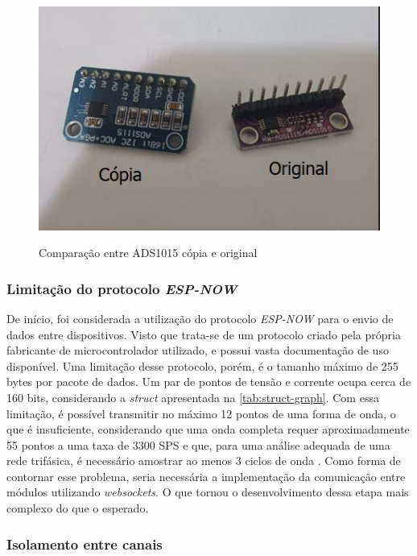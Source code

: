 \begin{figure}[h!]
    \centering
    \caption{Comparação entre ADS1015 cópia e original}
    \includegraphics[width=\textwidth, height=\textheight, keepaspectratio]{figuras/adc-fake-comparison.jpeg}
    \label{fig:adc-falsificado}
    \fonte{}
\end{figure}

\subsubsection{Limitação do protocolo \textit{ESP-NOW}}\label{limit-espnow}

De início, foi considerada a utilização do protocolo \textit{ESP-NOW} para o envio de dados entre dispositivos. Visto que trata-se de um protocolo criado pela própria fabricante de microcontrolador utilizado, e possui vasta documentação de uso disponível.
Uma limitação desse protocolo, porém, é o tamanho máximo de 255 bytes por pacote de dados. Um par de pontos de tensão e corrente ocupa cerca de 160 bits, considerando a \textit{struct} apresentada na \autoref{tab:struct-graph}. Com essa limitação, é possível transmitir no máximo 12 pontos de uma forma de onda, o que é insuficiente, considerando que uma onda completa requer aproximadamente 55 pontos a uma taxa de 3300 \gls{SPS} e que, para uma análise adequada de uma rede trifásica, é necessário amostrar ao menos 3 ciclos de onda \cite{3ph-ozm}.
Como forma de contornar esse problema, seria necessária a implementação da comunicação entre módulos utilizando \textit{websockets}. O que tornou o desenvolvimento dessa etapa mais complexo do que o esperado.

\subsubsection{Isolamento entre canais}\label{isola-canais-dific}

